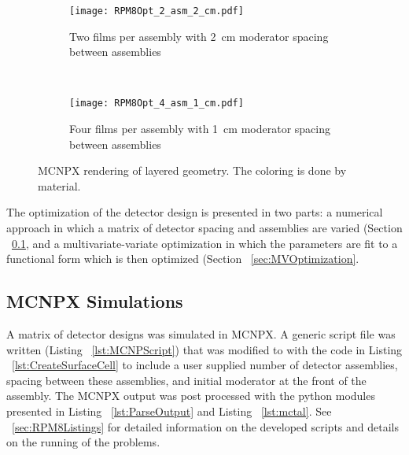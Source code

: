 \begin{figure}
    \centering
    \begin{subfigure}[b]{0.45\textwidth}
        \texttt{[image: RPM8Opt\_2\_asm\_2\_cm.pdf]}
        \caption{Two films per assembly with \SI{2}{\centi\meter} moderator spacing between assemblies}
    \end{subfigure}%
    ~
    \begin{subfigure}[b]{0.45\textwidth}
        \texttt{[image: RPM8Opt\_4\_asm\_1\_cm.pdf]}
        \caption{Four films per assembly with \SI{1}{\centi\meter} moderator spacing between assemblies}
    \end{subfigure}
    \caption{MCNPX rendering of layered geometry. The coloring is done by material.}
    \label{fig:MCNPXRendering}
\end{figure}
The optimization of the detector design is presented in two parts: a numerical approach in which a matrix of detector spacing and assemblies are varied (Section ~\ref{sec:MCNPXMethods}, and a multivariate-variate optimization in which the parameters are fit to a functional form which is then optimized (Section ~\ref{sec:MVOptimization}.
\subsection{MCNPX Simulations}
\label{sec:MCNPXMethods}
A matrix of detector designs was simulated in MCNPX.
A generic script file was written (Listing ~\ref{lst:MCNPScript}) that was modified to with the code in Listing ~\ref{lst:CreateSurfaceCell} to include a user supplied number of detector assemblies, spacing between these assemblies, and initial moderator at the front of the assembly.
The MCNPX output was post processed with the python modules presented in Listing ~\ref{lst:ParseOutput} and Listing ~\ref{lst:mctal}.
See ~\ref{sec:RPM8Listings} for detailed information on the developed scripts and details on the running of the problems.

